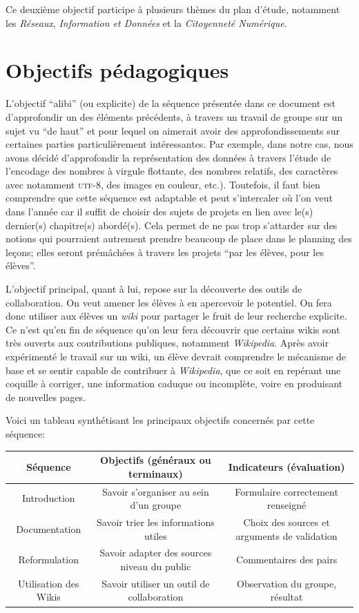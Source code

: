 \documentclass[11pt,bibliography=totoc]{scrartcl}
\newcommand\ajout[1]{{\color{blue} #1}}
\begin{document}
Ce deuxième objectif participe à plusieurs thèmes du plan d'étude, notamment les
\textit{Réseaux}, \textit{Information et Données} et la \textit{Citoyenneté
  Numérique}.

\section{Objectifs pédagogiques}
L'objectif ``alibi'' (ou explicite) de la séquence présentée dans ce document
est d'approfondir un des éléments précédents, à travers un travail de groupe sur
un sujet vu ``de haut'' et pour lequel on aimerait avoir des approfondissements
sur certaines parties particulièrement intéressantes.  Par exemple, dans notre
cas, nous avons décidé d'approfondir la représentation des données à travers
l'étude de l'encodage des nombres à virgule flottante, des nombres relatifs, des
caractères avec notamment \textsc{utf}-8, des images en couleur, etc.).
Toutefois, il faut bien comprendre que cette séquence est adaptable et peut
s'intercaler où l'on veut dans l'année car il suffit de choisir des sujets de
projets en lien avec le(s) dernier(s) chapitre(s) abordé(s). Cela permet de ne
pas trop s'attarder sur des notions qui pourraient autrement prendre beaucoup de
place dans le planning des leçons; elles seront prémâchées à travers les projets
``par les élèves, pour les élèves''.

L'objectif principal, quant à lui, repose sur la découverte des outils de
collaboration. On veut amener les élèves à en apercevoir le potentiel.  On fera
donc utiliser aux élèves un \textit{wiki} pour partager le fruit de leur
recherche explicite.  Ce n'est qu'en fin de séquence qu'on leur fera découvrir
que certains wikis sont très ouverts aux contributions publiques, notamment
\textit{Wikipedia}.  Après avoir expérimenté le travail sur un wiki, un élève
devrait comprendre le mécanisme de base et se sentir capable de contribuer à
\textit{Wikipedia}, que ce soit en repérant une coquille à corriger, une
information caduque ou incomplète, voire en produisant de nouvelles pages.

\ajout {
Voici un tableau synthétisant les principaux objectifs concernés par cette séquence:
\begin{center}
   \begin{tabular}{| c | c | c | }
     \hline
     Séquence & Objectifs (généraux ou terminaux) & Indicateurs (évaluation) \\ 
     \hline
     Introduction & Savoir s'organiser au sein d'un groupe & Formulaire correctement renseigné \\ 
     \hline
     Documentation & Savoir trier les informations utiles & Choix des sources et arguments de validation \\
     \hline
     Reformulation & Savoir adapter des sources niveau du public & Commentaires des pairs \\
     \hline
     Utilisation des Wikis & Savoir utiliser un outil de collaboration & Observation du groupe, résultat \\
     \hline
   \end{tabular}
 \end{center}
}
\end{document}
